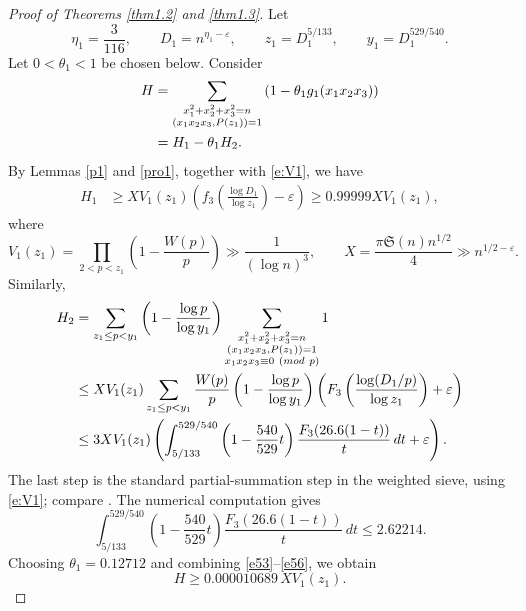 \documentclass[10pt,a4paper]{amsart}
\numberwithin{equation}{section}
\def\pmod #1{\ ({\rm{mod}}\ #1)}
\begin{document}
\begin{proof}[Proof of Theorems \ref{thm1.2} and \ref{thm1.3}]
Let
\[
\eta_1=\frac3{116},
\qquad
D_1=n^{\eta_1-\varepsilon},
\qquad
z_1=D_1^{5/133},
\qquad
y_1=D_1^{529/540}.
\]
Let $0<\theta_1<1$ be chosen below. Consider
\begin{align}\label{e53}
H
&=\sum_{\substack{x_1^2+x_2^2+x_3^2=n\\ (x_1x_2x_3,P(z_1))=1}}
\left(1-\theta_1g_1(x_1x_2x_3)\right) \notag\\
&=H_1-\theta_1H_2.
\end{align}
By Lemmas \ref{p1} and \ref{pro1}, together with \eqref{e:V1}, we have
\begin{align}\label{e54}
H_1
&\geq
XV_1(z_1)\left(f_3\left(\frac{\log D_1}{\log z_1}\right)-\varepsilon\right)
\geq 0.99999XV_1(z_1),
\end{align}
where
\[
V_1(z_1)=\prod_{2<p<z_1}\left(1-\frac{W(p)}p\right)
\gg \frac1{(\log n)^3},
\qquad
X=\frac{\pi\mathfrak S(n)n^{1/2}}4\gg n^{1/2-\varepsilon}.
\]
Similarly,
\begin{align}\label{e55}
H_2
&=\sum_{z_1\leq p<y_1}
\left(1-\frac{\log p}{\log y_1}\right)
\sum_{\substack{x_1^2+x_2^2+x_3^2=n\\ (x_1x_2x_3,P(z_1))=1\\ x_1x_2x_3\equiv0\pmod p}}1 \notag\\
&\leq
XV_1(z_1)
\sum_{z_1\leq p<y_1}
\frac{W(p)}p
\left(1-\frac{\log p}{\log y_1}\right)
\left(F_3\left(\frac{\log(D_1/p)}{\log z_1}\right)+\varepsilon\right) \notag\\
&\leq
3XV_1(z_1)
\left(
\int_{5/133}^{529/540}
\left(1-\frac{540}{529}t\right)
\frac{F_3(26.6(1-t))}{t}\,dt+\varepsilon
\right).
\end{align}
The last step is the standard partial-summation step in the weighted sieve, using \eqref{e:V1}; compare \cite[Lemma 4.1]{Ir}. The numerical computation gives
\begin{equation}\label{e56}
\int_{5/133}^{529/540}
\left(1-\frac{540}{529}t\right)
\frac{F_3(26.6(1-t))}{t}\,dt
\leq 2.62214.
\end{equation}
Choosing $\theta_1=0.12712$ and combining \eqref{e53}--\eqref{e56}, we obtain
\begin{equation}\label{e57}
H\geq0.000010689\,XV_1(z_1).
\end{equation}


\end{proof}
\end{document}
